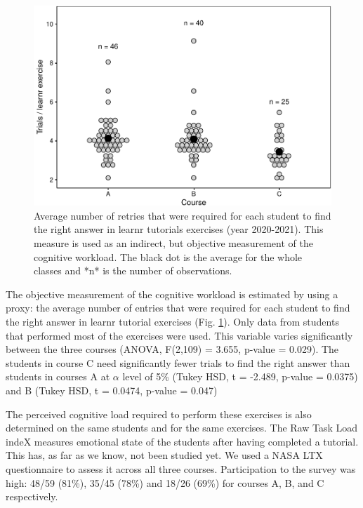 \documentclass{aims}
\theoremstyle{definition}
\begin{document}
\begin{figure}
\includegraphics[width=1\linewidth]{teaching_data_science_files/figure-latex/fig_learn_trials-1} \caption{\label{fig:fig_learn_trials} Average number of retries that were required for each student to find the right answer in learnr tutorials exercises (year 2020-2021). This measure is used as an indirect, but objective measurement of the cognitive workload. The black dot is the average for the whole classes and *n* is the number of observations.}\label{fig:fig_learn_trials}
\end{figure}

The objective measurement of the cognitive workload is estimated by
using a proxy: the average number of entries that were required for each
student to find the right answer in learnr tutorial exercises (Fig.
\ref {fig:fig_learn_trials}). Only data from students that performed
most of the exercises were used. This variable varies significantly
between the three courses (ANOVA, F(2,109) = 3.655, p-value = 0.029).
The students in course C need significantly fewer trials to find the
right answer than students in courses A at \(\alpha\) level of 5\%
(Tukey HSD, t = -2.489, p-value = 0.0375) and B (Tukey HSD, t = 0.0474,
p-value = 0.047)

The perceived cognitive load required to perform these exercises is also
determined on the same students and for the same exercises. The Raw Task
Load indeX measures emotional state of the students after having
completed a tutorial. This has, as far as we know, not been studied yet.
We used a NASA LTX questionnaire to assess it across all three courses.
Participation to the survey was high: 48/59 (81\%), 35/45 (78\%) and
18/26 (69\%) for courses A, B, and C respectively.
\end{document}
